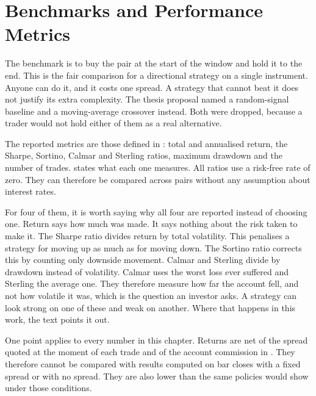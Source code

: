 \section{Benchmarks and Performance Metrics}

The benchmark is to buy the pair at the start of the window and hold it to the end. This is the fair comparison for a directional strategy on a single instrument. Anyone can do it, and it costs one spread. A strategy that cannot beat it does not justify its extra complexity. The thesis proposal named a random-signal baseline and a moving-average crossover instead. Both were dropped, because a trader would not hold either of them as a real alternative.

The reported metrics are those defined in : total and annualised return, the Sharpe, Sortino, Calmar and Sterling ratios, maximum drawdown and the number of trades.  states what each one measures. All ratios use a risk-free rate of zero. They can therefore be compared across pairs without any assumption about interest rates.



For four of them, it is worth saying why all four are reported instead of choosing one. Return says how much was made. It says nothing about the risk taken to make it. The Sharpe ratio divides return by total volatility. This penalises a strategy for moving up as much as for moving down. The Sortino ratio corrects this by counting only downside movement. Calmar and Sterling divide by drawdown instead of volatility. Calmar uses the worst loss ever suffered and Sterling the average one. They therefore measure how far the account fell, and not how volatile it was, which is the question an investor asks. A strategy can look strong on one of these and weak on another. Where that happens in this work, the text points it out.

One point applies to every number in this chapter. Returns are net of the spread quoted at the moment of each trade and of the account commission in . They therefore cannot be compared with results computed on bar closes with a fixed spread or with no spread. They are also lower than the same policies would show under those conditions.